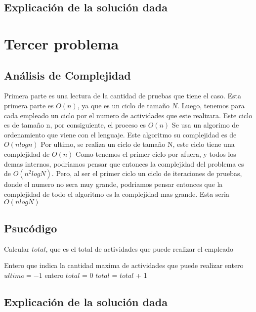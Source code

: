 \documentclass[a4paper,10pt]{article}
\begin{document}
\subsection{Explicación de la solución dada}
\section{Tercer problema}
\subsection{Análisis de Complejidad}
\hspace{0.5cm}Primera parte es una lectura de la cantidad de pruebas que tiene el caso.
  Esta primera parte es {$O(n)$}, ya que es un ciclo de tamaño {$N$}.
  Luego, tenemos para cada empleado un ciclo por el numero de actividades que este realizara.
  Este ciclo es de tamaño n, por consiguiente, el proceso es {$O(n)$}
  Se usa un algorimo de ordenamiento que viene con el lenguaje. Este algoritmo su complejidad es de {$O(nlogn)$}
  Por ultimo, se realiza un ciclo de tamaño N, este ciclo tiene una complejidad de {$O(n)$}
  Como tenemos el primer ciclo por afuera, y todos los demas internos, podriamos pensar que entonces 
  la complejidad del problema es de {$ O(n^{2}log N)$}. 
  Pero, al ser el primer ciclo un ciclo de iteraciones de pruebas, donde el numero no sera muy grande, 
  podriamos pensar entonces que la complejidad de todo el algoritmo es la complejidad mas grande. 
  Esta seria {$O(nlogN)$} 
\subsection{Psucódigo}
\begin{algorithm}                      %
\caption{Calcular $total$, que es el total de actividades que puede realizar el empleado}          %
\label{Problema 3}                           %
\begin{algorithmic}[1]                    %
    \ENSURE Entero que indica la cantidad maxima de actividades que puede realizar
    \STATE entero {$ultimo = -1$}
    \STATE entero {$total$ = $0$}
	\STATE $total$ = $total$ + 1 
	\ENDIF
    \ENDFOR
\end{algorithmic}
\end{algorithm}
\subsection{Explicación de la solución dada}
\end{document}
